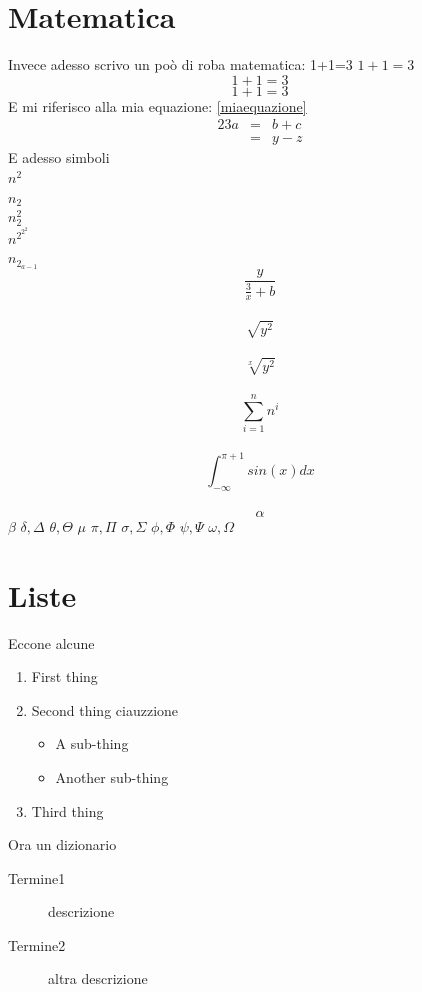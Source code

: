 \documentclass[a4paper,12pt]{article}
\begin{document}
\section{Matematica}

Invece adesso scrivo un poò di roba matematica: 1+1=3 $1+1=3$ $$1+1=3$$ %
	\begin{equation}
		\label{miaequazione}
		1+1=3
	\end{equation}
E mi riferisco alla mia equazione: \ref{miaequazione}
	\begin{eqnarray*} %
		23a & = & b + c \\
		& = & y - z
	\end{eqnarray*}
E adesso simboli\\
	$n^2$\\
	$n_2$\\
	$n_2^2$\\
	$n^{2^{2^2}}$\\
	$n_{2_{a-1}}$\\
	$$\frac{y}{\frac{3}{x}+b}$$\\
	$$\sqrt{y^2}$$\\
	$$\sqrt[x]{y^2}$$\\
	$$ \sum_{i=1}^{n} n^i $$\\
	$$\int_{-\infty}^{\pi+1}sin(x)dx$$\\
	$$\alpha$$
	$\beta$ 
	$\delta, \Delta$
	$\theta, \Theta$ 
	$\mu$
	$\pi, \Pi$
	$\sigma, \Sigma$
	$\phi, \Phi$ 
	$\psi, \Psi$ 
	$\omega, \Omega$ 

\section{Liste}
Eccone alcune

	\begin{enumerate}
	\item First thing
	\item Second thing ciauzzione
		\begin{itemize}
		\item A sub-thing
		\item Another sub-thing
		\end{itemize}
	\item Third thing
	\end{enumerate}
	
	Ora un dizionario
	\begin{description}
		\item [Termine1] descrizione
		\item [Termine2] altra descrizione
	\end{description}
\end{document}
